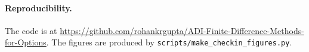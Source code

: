 \documentclass[11pt]{article}
\begin{document}
\paragraph{Reproducibility.}
The code is at \url{https://github.com/rohankrgupta/ADI-Finite-Difference-Methods-for-Options}. The figures are
produced by \texttt{scripts/make\_checkin\_figures.py}.

{\small

}
\end{document}
